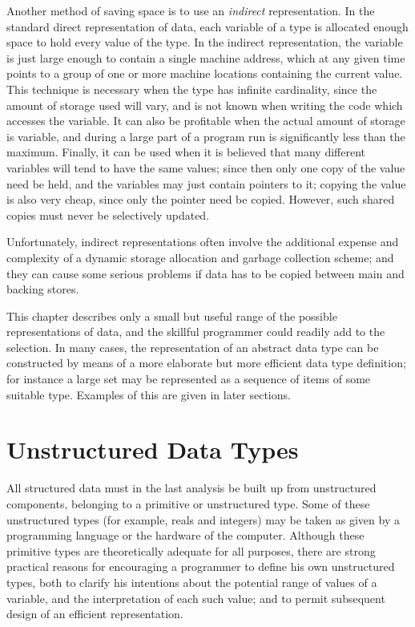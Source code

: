 Another method of saving space is to use an \textit{indirect} representation. In the standard direct representation of data, each variable of a type is allocated enough space to hold every value of the type. In the indirect representation, the variable is just large enough to contain a single machine address, which at any given time points to a group of one or more machine locations containing the current value. This technique is necessary when the type has infinite cardinality, since the amount of storage used will vary, and is not known when writing the code which accesses the variable. It can also be profitable when the actual amount of storage is variable, and during a large part of a program run is significantly less than the maximum. Finally, it can be used when it is believed that many different variables will tend to have the same values; since then only one copy of the value need be held, and the variables may just contain pointers to it; copying the value is also very cheap, since only the pointer need be copied. However, such shared copies must never be selectively updated.

Unfortunately, indirect representations often involve the additional expense and complexity of a dynamic storage allocation and garbage collection scheme; and they can cause some serious problems if data has to be copied between main and backing stores.

This chapter describes only a small but useful range of the possible representations of data, and the skillful programmer could readily add to the selection. In many cases, the representation of an abstract data type can be constructed by means of a more elaborate but more efficient data type definition; for instance a large set may be represented as a sequence of items of some suitable type. Examples of this are given in later sections.

\section[Unstructured data types]{Unstructured Data Types}
\label{sec:unstructured-data-types}

All structured data must in the last analysis be built up from unstructured components, belonging to a primitive or unstructured type. Some of these unstructured types (for example, reals and integers) may be taken as given by a programming language or the hardware of the computer. Although these primitive types are theoretically adequate for all purposes, there are strong practical reasons for encouraging a programmer to define his own unstructured types, both to clarify his intentions about the potential range of values of a variable, and the interpretation of each such value; and to permit subsequent design of an efficient representation.

